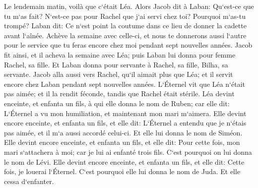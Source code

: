 \verse Le lendemain matin, voilà que c`était Léa. Alors Jacob dit à Laban: Qu`est-ce que tu m`as fait? N`est-ce pas pour Rachel que j`ai servi chez toi? Pourquoi m`as-tu trompé? 
\verse Laban dit: Ce n`est point la coutume dans ce lieu de donner la cadette avant l`aînée. 
\verse Achève la semaine avec celle-ci, et nous te donnerons aussi l`autre pour le service que tu feras encore chez moi pendant sept nouvelles années. 
\verse Jacob fit ainsi, et il acheva la semaine avec Léa; puis Laban lui donna pour femme Rachel, sa fille. 
\verse Et Laban donna pour servante à Rachel, sa fille, Bilha, sa servante. 
\verse Jacob alla aussi vers Rachel, qu`il aimait plus que Léa; et il servit encore chez Laban pendant sept nouvelles années. 
\verse L`Éternel vit que Léa n`était pas aimée; et il la rendit féconde, tandis que Rachel était stérile. 
\verse Léa devint enceinte, et enfanta un fils, à qui elle donna le nom de Ruben; car elle dit: L`Éternel a vu mon humiliation, et maintenant mon mari m`aimera. 
\verse Elle devint encore enceinte, et enfanta un fils, et elle dit: L`Éternel a entendu que je n`étais pas aimée, et il m`a aussi accordé celui-ci. Et elle lui donna le nom de Siméon. 
\verse Elle devint encore enceinte, et enfanta un fils, et elle dit: Pour cette fois, mon mari s`attachera à moi; car je lui ai enfanté trois fils. C`est pourquoi on lui donna le nom de Lévi. 
\verse Elle devint encore enceinte, et enfanta un fils, et elle dit: Cette fois, je louerai l`Éternel. C`est pourquoi elle lui donna le nom de Juda. Et elle cessa d`enfanter. 

